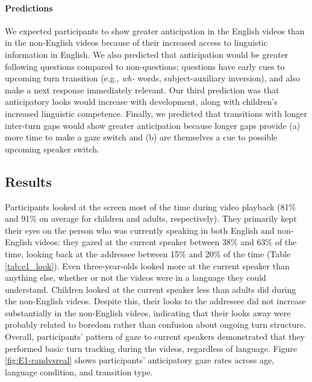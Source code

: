 \documentclass[authoryear, 12pt]{elsarticle}
\begin{document}
\paragraph{Predictions}
We expected participants to show greater anticipation in the English videos than in the non-English videos because of their increased access to linguistic information in English. We also predicted that anticipation would be greater following questions compared to non-questions; questions have early cues to upcoming turn transition (e.g., \textit{wh-} words, subject-auxiliary inversion), and also make a next response immediately relevant. Our third prediction was that anticipatory looks would increase with development, along with children's increased linguistic competence. Finally, we predicted that transitions with longer inter-turn gaps would show greater anticipation because longer gaps provide (a) more time to make a gaze switch and (b) are themselves a cue to possible upcoming speaker switch.

\subsection*{Results}
\label{sec:results1}

Participants looked at the screen most of the time during video playback (81\% and 91\% on average for children and adults, respectively). They primarily kept their eyes on the person who was currently speaking in both English and non-English videos: they gazed at the current speaker between 38\% and 63\% of the time, looking back at the addressee between 15\% and 20\% of the time (Table \ref{tab:e1_look}). Even three-year-olds looked more at the current speaker than anything else, whether or not the videos were in a language they could understand. Children looked at the current speaker less than adults did during the non-English videos. Despite this, their looks to the addressee did not increase substantially in the non-English videos, indicating that their looks away were probably related to boredom rather than confusion about ongoing turn structure. Overall, participants' pattern of gaze to current speakers demonstrated that they performed basic turn tracking during the videos, regardless of language. Figure \ref{fig:E1-randvsreal} shows participants' anticipatory gaze rates across age, language condition, and transition type.
\end{document}

